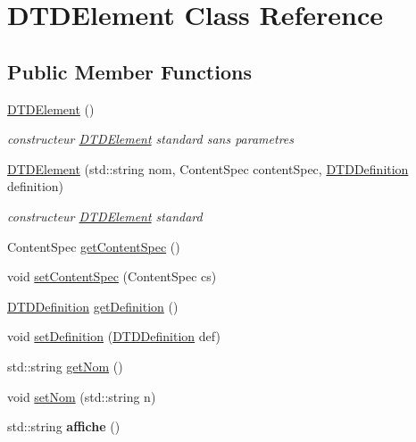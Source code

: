 \hypertarget{class_d_t_d_element}{\section{\-D\-T\-D\-Element \-Class \-Reference}
\label{class_d_t_d_element}
}
\subsection*{\-Public \-Member \-Functions}
\begin{DoxyCompactItemize}
\item 
\hypertarget{class_d_t_d_element_a87171dd4bc6dbcb8ab12a2b5b69f9abc}{\hyperlink{class_d_t_d_element_a87171dd4bc6dbcb8ab12a2b5b69f9abc}{\-D\-T\-D\-Element} ()}\label{class_d_t_d_element_a87171dd4bc6dbcb8ab12a2b5b69f9abc}

\begin{DoxyCompactList}\small\item\em constructeur \hyperlink{class_d_t_d_element}{\-D\-T\-D\-Element} standard sans parametres \end{DoxyCompactList}\item 
\hyperlink{class_d_t_d_element_aed99d625783d40a963b6575f5b1b3b40}{\-D\-T\-D\-Element} (std\-::string nom, \-Content\-Spec content\-Spec, \hyperlink{class_d_t_d_definition}{\-D\-T\-D\-Definition} definition)
\begin{DoxyCompactList}\small\item\em constructeur \hyperlink{class_d_t_d_element}{\-D\-T\-D\-Element} standard \end{DoxyCompactList}\item 
\-Content\-Spec \hyperlink{class_d_t_d_element_a5e7ac76ee99272cdb284cfa66f483187}{get\-Content\-Spec} ()
\item 
void \hyperlink{class_d_t_d_element_aa89f50c53ccebe15e30fdc1849ff1fad}{set\-Content\-Spec} (\-Content\-Spec cs)
\item 
\hyperlink{class_d_t_d_definition}{\-D\-T\-D\-Definition} \hyperlink{class_d_t_d_element_a7ad86d221816caf2a98db21e0764adf9}{get\-Definition} ()
\item 
void \hyperlink{class_d_t_d_element_a71243ea1102ba0d9731cfbc94d1f0593}{set\-Definition} (\hyperlink{class_d_t_d_definition}{\-D\-T\-D\-Definition} def)
\item 
std\-::string \hyperlink{class_d_t_d_element_a983f5561bdbf1b7b7127908bad9e8b15}{get\-Nom} ()
\item 
void \hyperlink{class_d_t_d_element_a24c5e3b8285d0fbfaff34ca809fd2580}{set\-Nom} (std\-::string n)
\item 
\hypertarget{class_d_t_d_element_ab74cfbd59f2624818bde835e89156b10}{std\-::string {\bfseries affiche} ()}\label{class_d_t_d_element_ab74cfbd59f2624818bde835e89156b10}


\end{DoxyCompactItemize}
